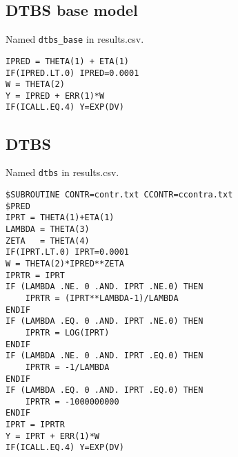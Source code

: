 \subsection{DTBS base model}
Named \verb|dtbs_base| in results.csv.
\begin{verbatim}
IPRED = THETA(1) + ETA(1)
IF(IPRED.LT.0) IPRED=0.0001
W = THETA(2)
Y = IPRED + ERR(1)*W
IF(ICALL.EQ.4) Y=EXP(DV)
\end{verbatim}

\subsection{DTBS}
Named \verb|dtbs| in results.csv.

\begin{verbatim}
$SUBROUTINE CONTR=contr.txt CCONTR=ccontra.txt
$PRED
IPRT = THETA(1)+ETA(1)
LAMBDA = THETA(3)
ZETA   = THETA(4)
IF(IPRT.LT.0) IPRT=0.0001
W = THETA(2)*IPRED**ZETA
IPRTR = IPRT
IF (LAMBDA .NE. 0 .AND. IPRT .NE.0) THEN
	IPRTR = (IPRT**LAMBDA-1)/LAMBDA
ENDIF
IF (LAMBDA .EQ. 0 .AND. IPRT .NE.0) THEN
    IPRTR = LOG(IPRT)
ENDIF
IF (LAMBDA .NE. 0 .AND. IPRT .EQ.0) THEN
	IPRTR = -1/LAMBDA
ENDIF
IF (LAMBDA .EQ. 0 .AND. IPRT .EQ.0) THEN
	IPRTR = -1000000000
ENDIF
IPRT = IPRTR
Y = IPRT + ERR(1)*W
IF(ICALL.EQ.4) Y=EXP(DV)
\end{verbatim}


